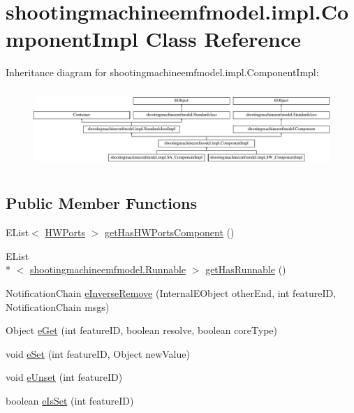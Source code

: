 \hypertarget{classshootingmachineemfmodel_1_1impl_1_1_component_impl}{\section{shootingmachineemfmodel.\-impl.\-Component\-Impl Class Reference}
\label{classshootingmachineemfmodel_1_1impl_1_1_component_impl}
}
Inheritance diagram for shootingmachineemfmodel.\-impl.\-Component\-Impl\-:\begin{figure}[H]
\begin{center}
\leavevmode
\includegraphics[height=3.030303cm]{classshootingmachineemfmodel_1_1impl_1_1_component_impl}
\end{center}
\end{figure}
\subsection*{Public Member Functions}
\begin{DoxyCompactItemize}
\item 
E\-List$<$ \hyperlink{interfaceshootingmachineemfmodel_1_1_h_w_ports}{H\-W\-Ports} $>$ \hyperlink{classshootingmachineemfmodel_1_1impl_1_1_component_impl_a278ec36c9c5c095e447ab6623e7c5900}{get\-Has\-H\-W\-Ports\-Component} ()
\item 
E\-List\\*
$<$ \hyperlink{interfaceshootingmachineemfmodel_1_1_runnable}{shootingmachineemfmodel.\-Runnable} $>$ \hyperlink{classshootingmachineemfmodel_1_1impl_1_1_component_impl_ad5149ad613dfe9c0e5fdd8db70d7df1d}{get\-Has\-Runnable} ()
\item 
Notification\-Chain \hyperlink{classshootingmachineemfmodel_1_1impl_1_1_component_impl_a150a9843354ec0d4f91eff65e011b420}{e\-Inverse\-Remove} (Internal\-E\-Object other\-End, int feature\-I\-D, Notification\-Chain msgs)
\item 
Object \hyperlink{classshootingmachineemfmodel_1_1impl_1_1_component_impl_a1955f2b649b9822c6890341985b29815}{e\-Get} (int feature\-I\-D, boolean resolve, boolean core\-Type)
\item 
void \hyperlink{classshootingmachineemfmodel_1_1impl_1_1_component_impl_a04fd3e10cdac690caa59413d68681c25}{e\-Set} (int feature\-I\-D, Object new\-Value)
\item 
void \hyperlink{classshootingmachineemfmodel_1_1impl_1_1_component_impl_a4cc7cdf285baf25f22f22334df954c80}{e\-Unset} (int feature\-I\-D)
\item 
boolean \hyperlink{classshootingmachineemfmodel_1_1impl_1_1_component_impl_a92135445c354e434145c7ff762b3d977}{e\-Is\-Set} (int feature\-I\-D)
\end{DoxyCompactItemize}
